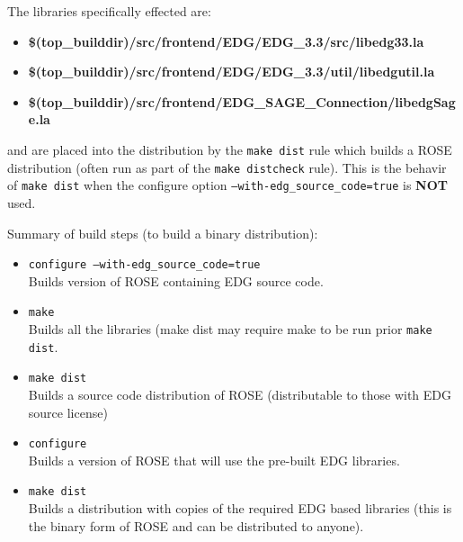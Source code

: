 The libraries specifically effected are:
\begin{itemize}
   \item {\bf \$(top_builddir)/src/frontend/EDG/EDG_3.3/src/libedg33.la}
   \item {\bf \$(top_builddir)/src/frontend/EDG/EDG_3.3/util/libedgutil.la}
   \item {\bf \$(top_builddir)/src/frontend/EDG_SAGE_Connection/libedgSage.la}
\end{itemize}
and are placed into the distribution by the {\tt make dist} rule which builds a ROSE distribution
(often run as part of the {\tt make distcheck} rule).  This is the behavir of {\tt make dist}
when the configure option {\tt --with-edg_source_code=true} is {\bf NOT} used.

Summary of build steps (to build a binary distribution):
\begin{itemize}
   \item {\tt configure --with-edg_source_code=true} \\
          Builds version of ROSE containing EDG source code.
   \item  {\tt make} \\
          Builds all the libraries (make dist may require make to be run prior {\tt make dist}.
   \item  {\tt make dist} \\
          Builds a source code distribution of ROSE (distributable to those with EDG source license)
   \item {\tt configure} \\
          Builds a version of ROSE that will use the pre-built EDG libraries.
   \item {\tt make dist} \\
          Builds a distribution with copies of the required EDG based libraries
          (this is the binary form of ROSE and can be distributed to anyone).
\end{itemize}


